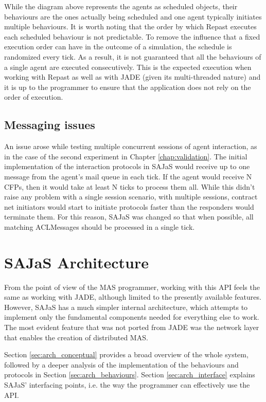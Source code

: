 While the diagram above represents the agents as scheduled objects, their behaviours are the ones actually being scheduled and one agent typically initiates multiple behaviours. It is worth noting that the order by which Repast executes each scheduled behaviour is not predictable. To remove the influence that a fixed execution order can have in the outcome of a simulation, the schedule is randomized every tick. As a result, it is not guaranteed that all the behaviours of a single agent are executed consecutively. This is the expected execution when working with Repast as well as with JADE (given its multi-threaded nature) and it is up to the programmer to ensure that the application does not rely on the order of execution.

\subsection{Messaging issues}
\label{sec:mess_issues}
An issue arose while testing multiple concurrent sessions of agent interaction, as in the case of the second experiment in Chapter \ref{chap:validation}. The initial implementation of the interaction protocols in SAJaS would receive up to one message from the agent's mail queue in each tick. If the agent would receive N CFPs, then it would take at least N ticks to process them all. While this didn't raise any problem with a single session scenario, with multiple sessions, contract net initiators would start to initiate protocols faster than the responders would terminate them. For this reason, SAJaS was changed so that when possible, all matching ACLMessages should be processed in a single tick.

\section{SAJaS Architecture}

From the point of view of the MAS programmer, working with this API feels the same as working with JADE, although limited to the presently available features. However, SAJaS has a much simpler internal architecture, which attempts to implement only the fundamental components needed for everything else to work. The most evident feature that was not ported from JADE was the network layer that enables the creation of distributed MAS.

Section \ref{sec:arch_conceptual} provides a broad overview of the whole system, followed by a deeper analysis of the implementation of the behaviours and protocols in Section \ref{sec:arch_behaviours}. Section \ref{sec:arch_interface} explains SAJaS' interfacing points, i.e. the way the programmer can effectively use the API.

